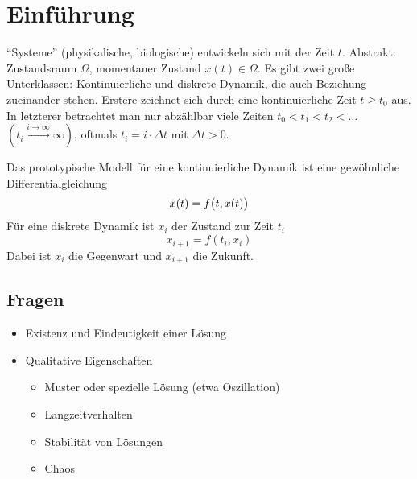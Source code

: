 
\newcommand{\fach}{Dynamische Systeme}
\newcommand{\semester}{WiSe 2014/2015}
\newcommand{\homepage}{https://wwwmath.uni-muenster.de/num/herrmann/sose2015/vl_dyn_sys/index.html}

\newcommand{\prof}{Prof.\ Dr.\ Michael Herrmann}



\maketitle
\begin{abstract}

\end{abstract}

\tableofcontents
\cleardoubleoddemptypage

\setcounter{page}{1}

\setcounter{section}{-1}
\section{Einführung} %
\label{sec:einfuhrung}
\enquote{Systeme} (physikalische, biologische) entwickeln sich mit der Zeit $t$. Abstrakt: Zustandsraum $\Omega$, momentaner Zustand $x(t) \in \Omega$. Es gibt zwei große 
Unterklassen: Kontinuierliche und diskrete Dynamik, die auch Beziehung zueinander stehen. Erstere zeichnet sich durch eine kontinuierliche Zeit $t \ge t_0$ aus. In letzterer 
betrachtet man nur abzählbar viele Zeiten $t_0 < t_1 < t_2 < \ldots $ $(t_i \xrightarrow{i \to \infty} \infty)$, oftmals $t_i = i \cdot \Delta t$ mit $\Delta t >0$.

Das prototypische Modell für eine kontinuierliche Dynamik ist eine gewöhnliche Differentialgleichung
\[
	\dot{x}(t) = f \enbrace[\big]{t,x(t)} 
\]
Für eine diskrete Dynamik ist $x_i$ der Zustand zur Zeit $t_i$
\[
	x_{i+1} = f (t_i, x_i)
\]
Dabei ist $x_i$ die Gegenwart und $x_{i+1}$ die Zukunft.
\subsection{Fragen} %
\label{sub:fragen}
\begin{itemize}
	\item Existenz und Eindeutigkeit einer Lösung
	\item Qualitative Eigenschaften
	\begin{itemize}
		\item Muster oder spezielle Lösung (etwa Oszillation)
		\item Langzeitverhalten
		\item Stabilität von Lösungen
		\item Chaos
	\end{itemize}
\end{itemize}
\newpage

